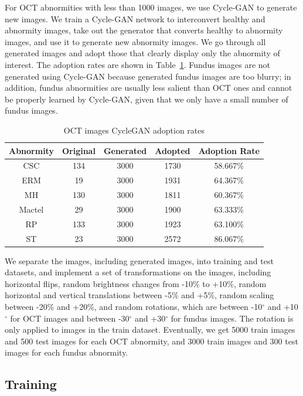 \documentclass{article}
\begin{document}
	For OCT abnormities with less than 1000 images, we use Cycle-GAN to generate new images. We train a Cycle-GAN network to interconvert healthy and abnormity images, take out the generator that converts healthy to abnormity images, and use it to generate new abnormity images. We go through all generated images and adopt those that clearly display only the abnormity of interest. The adoption rates are shown in Table~\ref{tb:cycleGAN_number}. Fundus images are not generated using Cycle-GAN because generated fundus images are too blurry; in addition, fundus abnormities are usually less salient than OCT ones and cannot be properly learned by Cycle-GAN, given that we only have a small number of fundus images.
	
	{
		\fontsize{9}{12}\selectfont
		{
			\begin{longtable}{ccccc}
				\caption{OCT images CycleGAN adoption rates}
				\label{tb:cycleGAN_number}\\
				\toprule
				Abnormity&Original&Generated&Adopted&Adoption Rate\\
				\midrule
				CSC   &134&3000&1730&58.667\% \\
				ERM   &19 &3000&1931&64.367\% \\
				MH    &130&3000&1811&60.367\% \\
				Mactel&29 &3000&1900&63.333\% \\
				RP    &133&3000&1923&63.100\% \\
				ST    &23 &3000&2572&86.067\% \\
				\bottomrule
			\end{longtable}
		}
	}
	
	We separate the images, including generated images, into training and test datasets, and implement a set of transformations on the images, including horizontal flips, random brightness changes from -10\% to +10\%, random horizontal and vertical translations between -5\% and +5\%, random scaling between -20\% and +20\%, and random rotations, which are between -10$^\circ$ and +10$^\circ$ for OCT images and between -30$^\circ$ and +30$^\circ$ for fundus images. The rotation is only applied to images in the train dataset. Eventually, we get 5000 train images and 500 test images for each OCT abnormity, and 3000 train images and 300 test images for each fundus abnormity.
	
	\subsection{Training}
	
\end{document}
